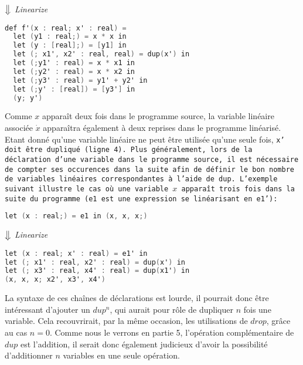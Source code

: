 \documentclass[a4paper, french, 11pt]{article}
\begin{document}
\begin{center}
  $\big\Downarrow$ \textit{Linearize}
\end{center}

\begin{lstlisting}[style=myStyle, language=C]
def f'(x : real; x' : real) =
  let (y1 : real;) = x * x in
  let (y : [real];) = [y1] in
  let (; x1', x2' : real, real) = dup(x') in
  let (;y1' : real) = x * x1 in
  let (;y2' : real) = x * x2 in
  let (;y3' : real) = y1' + y2' in
  let (;y' : [real]) = [y3'] in
  (y; y')
\end{lstlisting}

Comme $x$ apparaît deux fois dans le programme source, la variable linéaire associée $\dot x$ apparaîtra également à deux reprises dans le programme linéarisé. Etant donné qu'une variable linéaire ne peut être utilisée qu'une seule fois, \tt x' \rm doit être dupliqué (ligne 4). Plus généralement, lors de la déclaration d'une variable dans le programme source, il est nécessaire de compter ses occurences dans la suite afin de définir le bon nombre de variables linéaires correspondantes à l'aide de \tt dup\rm. L'exemple suivant illustre le cas où une variable $x$ apparaît trois fois dans la suite du programme (\tt e1 \rm est une expression se linéarisant en \tt e1'\rm):

\begin{lstlisting}[style=myStyle, language=C]
let (x : real;) = e1 in (x, x, x;)
\end{lstlisting}  

\begin{center}
  $\big\Downarrow$ \textit{Linearize}
\end{center}

\begin{lstlisting}[style=myStyle, language=C]
let (x : real; x' : real) = e1' in
let (; x1' : real, x2' : real) = dup(x') in
let (; x3' : real, x4' : real) = dup(x1') in
(x, x, x; x2', x3', x4')
\end{lstlisting}

La syntaxe de ces chaînes de déclarations est lourde, il pourrait donc être intéressant d'ajouter un $dup^n$, qui aurait pour rôle de dupliquer $n$ fois une variable. Cela recouvrirait, par la même occasion, les utilisations de $drop$, grâce au cas $n = 0$. Comme nous le verrons en partie 5, l'opération complémentaire de $dup$ est l'addition, il serait donc également judicieux d'avoir la possibilité d'additionner $n$ variables en une seule opération.
\end{document}
